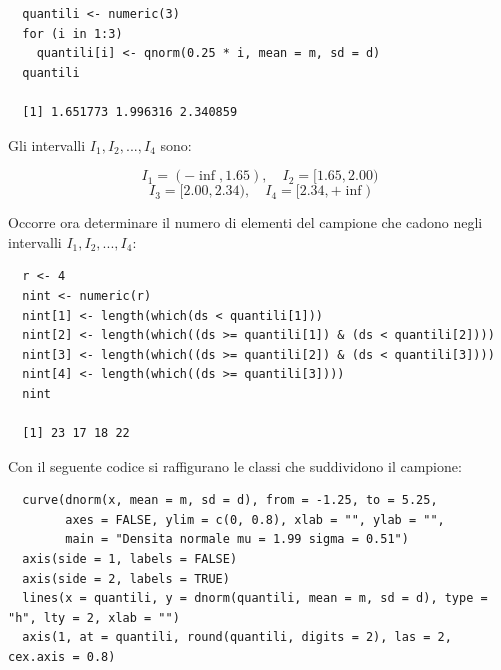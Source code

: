 \begin{lstlisting}
  quantili <- numeric(3)
  for (i in 1:3)
    quantili[i] <- qnorm(0.25 * i, mean = m, sd = d)
  quantili

  [1] 1.651773 1.996316 2.340859
\end{lstlisting}

Gli intervalli $I_1, I_2,..., I_4$ sono:

\[I_1 = (-\inf, 1.65), \quad I_2=[1.65, 2.00)\]
\[I_3 = [2.00,2.34), \quad I_4 = [2.34,+\inf)\]

Occorre ora determinare il numero di elementi del campione che cadono negli intervalli $I_1, I_2, ..., I_4$:

\begin{lstlisting}
  r <- 4
  nint <- numeric(r)
  nint[1] <- length(which(ds < quantili[1]))
  nint[2] <- length(which((ds >= quantili[1]) & (ds < quantili[2])))
  nint[3] <- length(which((ds >= quantili[2]) & (ds < quantili[3])))
  nint[4] <- length(which((ds >= quantili[3])))
  nint

  [1] 23 17 18 22
\end{lstlisting}

Con il seguente codice si raffigurano le classi che suddividono il campione:

\begin{lstlisting}
  curve(dnorm(x, mean = m, sd = d), from = -1.25, to = 5.25,
        axes = FALSE, ylim = c(0, 0.8), xlab = "", ylab = "",
        main = "Densita normale mu = 1.99 sigma = 0.51")
  axis(side = 1, labels = FALSE)
  axis(side = 2, labels = TRUE)
  lines(x = quantili, y = dnorm(quantili, mean = m, sd = d), type = "h", lty = 2, xlab = "")
  axis(1, at = quantili, round(quantili, digits = 2), las = 2, cex.axis = 0.8)
\end{lstlisting}

